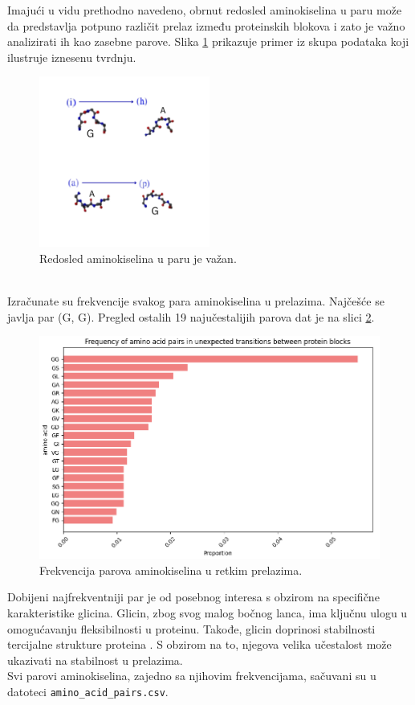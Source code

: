 \documentclass[a4paper,12pt]{article}
\begin{document}
Imajući u vidu prethodno navedeno, obrnut redosled aminokiselina u paru može da predstavlja potpuno različit prelaz između proteinskih blokova i zato je važno analizirati ih kao zasebne parove. Slika \ref{Slika:aa} prikazuje primer iz skupa podataka koji ilustruje iznesenu tvrdnju.
\begin{figure}[htbp]
    \centering
    \includegraphics[width=0.5\textwidth]{./images/aa.png}
    \caption{Redosled aminokiselina u paru je važan.}
    \label{Slika:aa}
\end{figure}
\\
Izračunate su frekvencije svakog para aminokiselina u prelazima. Najčešće se javlja par (G, G). Pregled ostalih 19 najučestalijih parova dat je na slici \ref{Slika:aafreq}.
\begin{figure}[htbp]
    \centering
    \includegraphics[width=1\textwidth]{./images/aafreq.png}
    \caption{Frekvencija parova aminokiselina u retkim prelazima.}
    \label{Slika:aafreq}
\end{figure}
\newpage
Dobijeni najfrekventniji par je od posebnog interesa s obzirom na specifične karakteristike glicina.
Glicin, zbog svog malog bočnog lanca, ima ključnu ulogu u omogućavanju fleksibilnosti u proteinu. Takođe, glicin doprinosi stabilnosti tercijalne strukture proteina \cite{dong2012glycines}. S obzirom na to, njegova velika učestalost može ukazivati na stabilnost u prelazima.\\
Svi parovi aminokiselina, zajedno sa njihovim frekvencijama, sačuvani su u datoteci \texttt{amino\_acid\_pairs.csv}.
\end{document}
